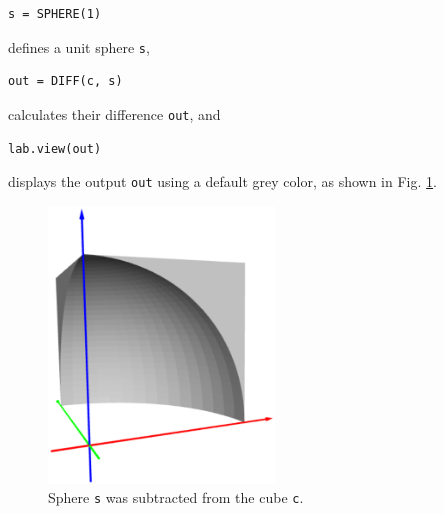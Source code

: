 \begin{bbox}
\begin{verbatim}
s = SPHERE(1)
\end{verbatim}
\end{bbox}
\vspace{6mm}

\noindent
\noindent
defines a unit sphere {\tt s},\\

\begin{bbox}
\begin{verbatim}
out = DIFF(c, s)
\end{verbatim}
\end{bbox}
\vspace{6mm}

\noindent
calculates their difference {\tt out}, and\\

\begin{bbox}
\begin{verbatim}
lab.view(out)
\end{verbatim}
\end{bbox}
\vspace{6mm}

\noindent
displays the output {\tt out} using a default grey color,
as shown in Fig. \ref{fig:diffcube}.
\newpage

\begin{figure}[!ht]
\begin{center}
\includegraphics[width=6cm]{img/sph-cube-111.png}
\end{center}
\vspace{-6mm}
\caption{Sphere {\tt s} was subtracted from the cube {\tt c}.}
\label{fig:diffcube}
\end{figure}

